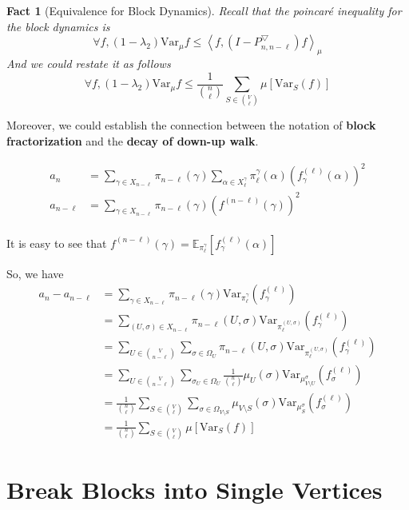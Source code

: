 \documentclass{article}
\newtheorem{fact}{Fact}[section]
\def\Var{\mathrm{Var}}
\def\<{\left\langle}
\def\>{\right\rangle}
\begin{document}
\begin{fact}[Equivalence for Block Dynamics]
  Recall that the poincar{\'e} inequality for the block dynamics is
  \[\forall f, (1 - \lambda_2) \Var_\mu f \leq \<f, (I - P^\bigtriangledown_{n,n-\ell})f\>_\mu\]
  And we could restate it as follows
  \[\forall f, (1 - \lambda_2) \Var_\mu f \leq \frac{1}{\binom{n}{\ell}} \sum_{S\in\binom{V}{\ell}} \mu[\Var_S(f)]\]
\end{fact}

Moreover, we could establish the connection between the notation of \textbf{block fractorization} and the \textbf{decay of down-up walk}.

\begin{align*}
  a_n &= \sum_{\gamma\in X_{n-\ell}} \pi_{n-\ell}(\gamma) \sum_{\alpha \in X^\gamma_\ell} \pi^\gamma_{\ell}(\alpha) (f^{(\ell)}_\gamma(\alpha))^2 \\
  a_{n-\ell} &= \sum_{\gamma\in X_{n-\ell}} \pi_{n-\ell}(\gamma) (f^{(n-\ell)}(\gamma))^2 \\
\end{align*}

It is easy to see that $f^{(n-\ell)}(\gamma) = \mathbb{E}_{\pi^\gamma_\ell} [f^{(\ell)}_\gamma(\alpha)]$

So, we have
\begin{align*}
  a_n - a_{n-\ell}
  &= \sum_{\gamma\in X_{n-\ell}} \pi_{n-\ell}(\gamma) \Var_{\pi^\gamma_\ell}(f^{(\ell)}_\gamma) \\
  &= \sum_{(U,\sigma)\in X_{n-\ell}} \pi_{n-\ell}(U, \sigma) \Var_{\pi^{(U,\sigma)}_\ell}(f^{(\ell)}_\gamma) \\
  &= \sum_{U\in\binom{V}{n-\ell}}\sum_{\sigma\in \Omega_U} \pi_{n-\ell}(U, \sigma) \Var_{\pi^{(U,\sigma)}_\ell}(f^{(\ell)}_\gamma) \\
  &= \sum_{U\in\binom{V}{n-\ell}}\sum_{\sigma_U\in \Omega_U} \frac{1}{\binom{n}{\ell}}\mu_U(\sigma) \Var_{\mu^\sigma_{V\setminus U}}(f^{(\ell)}_\sigma) \\
  &= \frac{1}{\binom{n}{\ell}}\sum_{S\in\binom{V}{\ell}}\sum_{\sigma\in\Omega_{V\setminus S}} \mu_{V\setminus S}(\sigma)\Var_{\mu^\sigma_S}(f^{(\ell)}_\sigma) \\
  &= \frac{1}{\binom{n}{\ell}} \sum_{S\in\binom{V}{\ell}} \mu [\Var_S(f)]
\end{align*}

\section{Break Blocks into Single Vertices}
\end{document}
